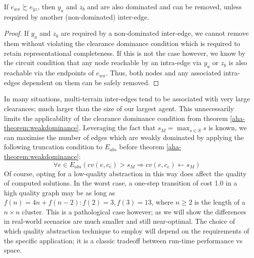 \begin{corollary}
If $e_{wx} \succsim e_{yz}$, then $y_{a}$ and $z_{b}$ and are also dominated and can be removed, unless required by another (non-dominated) inter-edge. 
\end{corollary}
\begin{proof}
If $y_{a}$ and $z_{b}$ are required by a non-dominated inter-edge, we cannot remove them without violating the clearance dominance condition which is required to retain representational completeness. 
If this is not the case however, we know by the circuit condition that any node reachable by an intra-edge via $y_{a}$ or $z_{b}$ is also reachable via the endpoints of $e_{wx}$. 
Thus, both nodes and any associated intra-edges dependent on them can be safely removed.
\end{proof}
In many situations, multi-terrain inter-edges tend to be associated with very large clearances; much larger than the size of our largest agent.
This unnecessarily limits the applicability of the clearance dominance condition from theorem \ref{aha-theorem:weakdominance}. 
Leveraging the fact that $s_M = \max_{s \in S} s$ is known, we can maximise the number of edges which are weakly dominated by applying the following truncation condition to $E_{abs}$ before theorem \ref{aha-theorem:weakdominance}:
$$
\forall e \in E_{abs} (cv(e, c_{e}) > s_M \Rightarrow cv(e, c_{e}) \leftarrow s_M) 
$$
Of course, opting for a low-quality abstraction in this way does affect the quality of computed solutions. 
In the worst case, a one-step transition of cost 1.0 in a high quality graph may be as long as $f(n) = 4n + f(n-2) : f(2) = 3, f(3) = 13$, where $n \geq 2$ is the length of a $n \times n$ cluster.
This is a pathological case however; as we will show the differences in real-world scenarios are much smaller and still near-optimal. 
The choice of which quality abstraction technique to employ will depend on the requirements of the specific application; it is a classic tradeoff between run-time performance vs space.

